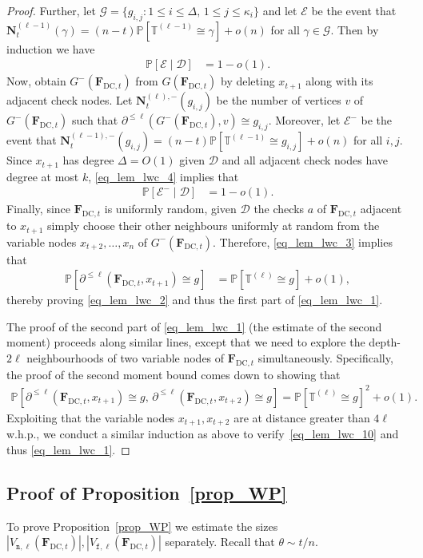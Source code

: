 \documentclass[10pt,reqno]{amsart}
\numberwithin{equation}{section}
\newcommand{\ism}{\cong}
\renewcommand{\vec}[1]{\boldsymbol{#1}}
\newcommand{\FDC}[1]{\PHI_{\mathrm{DC},{#1}}}
\newcommand{\frozen}{\mathtt{f}}
\newcommand{\nll}{\mathtt{n}}
\newcommand{\fzn}{\frozen}
\newcommand{\TT}{\mathbb T}
\newcommand\PHI{\vec F}
\newcommand\cD{\mathcal D}
\newcommand\cE{\mathcal E}
\newcommand\cG{\mathcal G}
\newcommand\vN{\vec N}
\newcommand\brk[1]{\left\lbrack{#1}\right\rbrack}
\newcommand{\whp}{w.h.p.}
\newcommand\pr{\mathbb{P}}
\newcommand\Prop{Proposition}
\def\pr{{\mathbb P}}
\begin{document}
\begin{proof}
	Further, let $\cG=\{g_{i,j}:1\leq i\leq\Delta,\,1\leq j\leq\kappa_i\}$ and let $\cE$ be the event that $\vN_t^{(\ell-1)}(\gamma)=(n-t)\pr\brk{\TT^{(\ell-1)}\ism \gamma}+o(n)$ for all $\gamma\in\cG$.
	Then by induction we have
	\begin{align}\label{eq_lem_lwc_4}
		\pr\brk{\cE\mid\cD}&=1-o(1).
	\end{align}
	Now, obtain $G^-(\FDC t)$ from $G(\FDC t)$ by deleting $x_{t+1}$ along with its adjacent check nodes.
	Let $\vN_t^{(\ell),-}(g_{i,j})$ be the number of vertices $v$ of $G^{-}(\FDC{t})$ such that $\partial^{\leq\ell}(G^-(\FDC t),v)\ism g_{i,j}$.
	Moreover, let $\cE^-$ be the event that $\vN_t^{(\ell-1),-}(g_{i,j})=(n-t)\pr\brk{\TT^{(\ell-1)}\ism g_{i,j}}+o(n)$ for all $i,j$.
	Since $x_{t+1}$ has degree $\Delta=O(1)$ given $\cD$ and all adjacent check nodes have degree at most $k$, \eqref{eq_lem_lwc_4} implies that
	\begin{align}\label{eq_lem_lwc_5}
		\pr\brk{\cE^-\mid\cD}&=1-o(1).
	\end{align}
	Finally, since $\FDC{t}$ is uniformly random, given $\cD$ the checks $a$ of $\FDC t$ adjacent to $x_{t+1}$ simply choose their other neighbours uniformly at random from the variable nodes $x_{t+2},\ldots,x_n$ of $G^-(\FDC t)$.
	Therefore, \eqref{eq_lem_lwc_3} implies that
	\begin{align*}
		\pr\brk{\partial^{\leq\ell}(\FDC t,x_{t+1})\ism g}&=
\pr\brk{\TT^{(\ell)}\ism g}+o(1),
	\end{align*}
	thereby proving \eqref{eq_lem_lwc_2} and thus the first part of \eqref{eq_lem_lwc_1}.


	The proof of the second part of \eqref{eq_lem_lwc_1} (the estimate of the second moment) proceeds along similar lines, except that we need to explore the depth-${2}\ell$ neighbourhoods of two variable nodes of $\FDC t$ simultaneously.
	Specifically, the proof of the second moment bound comes down to showing that
\begin{align}\label{eq_lem_lwc_10}
		\pr\brk{\partial^{\leq\ell}(\FDC t,x_{t+1})\ism g,\, \partial^{\leq\ell}(\FDC t,x_{t+2})\ism g}=\pr\brk{\TT^{(\ell)}\ism g}^2+o(1).
	\end{align}
	Exploiting that the variable nodes $x_{t+1},x_{t+2}$ are at distance greater than $4\ell$ \whp, we conduct a similar induction as above to verify~\eqref{eq_lem_lwc_10} and thus \eqref{eq_lem_lwc_1}.
\end{proof}

\subsection{Proof of \Prop~\ref{prop_WP}}\label{sec_proof_prop_WP}
To prove \Prop~\ref{prop_WP} we estimate the sizes $|V_{\nll,\ell}(\FDC{t})|,|V_{\fzn,\ell}(\FDC{t})|$ separately.
Recall that $\theta \sim t/n$.
\end{document}
